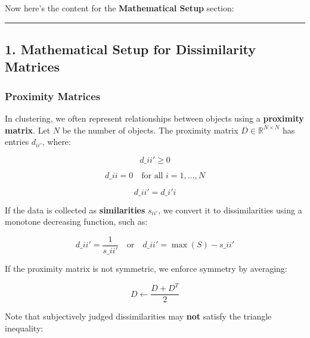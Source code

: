\documentclass[
]{article}
\begin{document}
Now here's the content for the \textbf{Mathematical Setup} section:

\begin{center}\rule{0.5\linewidth}{0.5pt}\end{center}

\hypertarget{mathematical-setup-for-dissimilarity-matrices}{%
\subsection{1. Mathematical Setup for Dissimilarity
Matrices}\label{mathematical-setup-for-dissimilarity-matrices}}

\hypertarget{proximity-matrices}{%
\subsubsection{Proximity Matrices}\label{proximity-matrices}}

In clustering, we often represent relationships between objects using a
\textbf{proximity matrix}. Let \(N\) be the number of objects. The
proximity matrix \(D \in \mathbb{R}^{N \times N}\) has entries
\(d_{ii'}\), where:

\begin{equation}
d\_{ii'} \geq 0
\end{equation}

\begin{equation}
d\_{ii} = 0 \quad \text{for all } i = 1, \dots, N
\end{equation}

\begin{equation}
d\_{ii'} = d\_{i'i}
\end{equation}

If the data is collected as \textbf{similarities} \(s_{ii'}\), we
convert it to dissimilarities using a monotone decreasing function, such
as:

\begin{equation}
d\_{ii'} = \frac{1}{s\_{ii'}} \quad \text{or} \quad d\_{ii'} = \max(S) - s\_{ii'}
\end{equation}

If the proximity matrix is not symmetric, we enforce symmetry by
averaging:

\begin{equation}
D \leftarrow \frac{D + D^T}{2}
\end{equation}

Note that subjectively judged dissimilarities may \textbf{not} satisfy
the triangle inequality:
\end{document}
